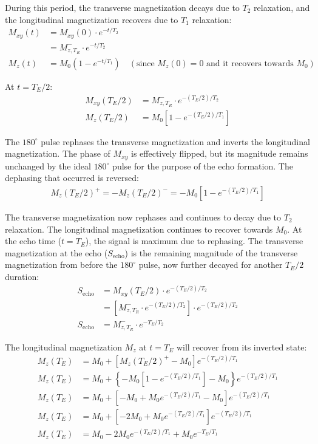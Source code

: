 \documentclass[10pt,a4paper,twoside]{article}
\begin{document}
During this period, the transverse magnetization decays due to $T_2$ relaxation, and the longitudinal magnetization recovers due to $T_1$ relaxation:
\begin{align*}
M_{xy}(t) &= M_{xy}(0) \cdot e^{-t/T_2} \\
&= M_{z,T_R}^- \cdot e^{-t/T_2} \\
M_z(t) &= M_0(1 - e^{-t/T_1}) \quad (\text{since } M_z(0)=0 \text{ and it recovers towards } M_0)
\end{align*}

At $t=T_E/2$:
\begin{align*}
M_{xy}(T_E/2) &= M_{z,T_R}^- \cdot e^{-(T_E/2)/T_2} \\
M_z(T_E/2) &= M_0 \left[ 1 - e^{-(T_E/2)/T_1}\right]
\end{align*}

The $180^\circ$ pulse rephases the transverse magnetization and inverts the longitudinal magnetization.
The phase of $M_{xy}$ is effectively flipped, but its magnitude remains unchanged by the ideal $180^\circ$ pulse for the purpose of the echo formation. The dephasing that occurred is reversed:
\begin{align*}
M_z(T_E/2)^+ = -M_z(T_E/2)^- = -M_0 \left[ 1 - e^{-(T_E/2)/T_1} \right]
\end{align*}

The transverse magnetization now rephases and continues to decay due to $T_2$ relaxation. The longitudinal magnetization continues to recover towards $M_0$. At the echo time ($t=T_E$), the signal is maximum due to rephasing. The transverse magnetization at the echo ($S_{\text{echo}}$) is the remaining magnitude of the transverse magnetization from before the $180^\circ$ pulse, now further decayed for another $T_E/2$ duration:
\begin{align*}
S_{\text{echo}} &= M_{xy}(T_E/2) \cdot e^{-(T_E/2)/T_2} \\
&= \left[ M_{z,T_R}^- \cdot e^{-(T_E/2)/T_2}\right] \cdot e^{-(T_E/2)/T_2} \\
S_{\text{echo}} &= M_{z,T_R}^- \cdot e^{-T_E/T_2}
\end{align*}

The longitudinal magnetization $M_z$ at $t=T_E$ will recover from its inverted state:
\begin{align*}
M_z(T_E) &= M_0 + \left[M_z(T_E/2)^+ - M_0 \right] e^{-(T_E/2)/T_1} \\
M_z(T_E) &= M_0 + \left\{ -M_0 \left[ 1 - e^{-(T_E/2)/T_1}\right] - M_0\right\} e^{-(T_E/2)/T_1} \\
M_z(T_E) &= M_0 + \left[ -M_0 + M_0 e^{-(T_E/2)/T_1} - M_0\right] e^{-(T_E/2)/T_1} \\
M_z(T_E) &= M_0 + \left[ -2M_0 + M_0 e^{-(T_E/2)/T_1}\right] e^{-(T_E/2)/T_1} \\
M_z(T_E) &= M_0 - 2M_0 e^{-(T_E/2)/T_1} + M_0 e^{-T_E/T_1}
\end{align*}
\end{document}
